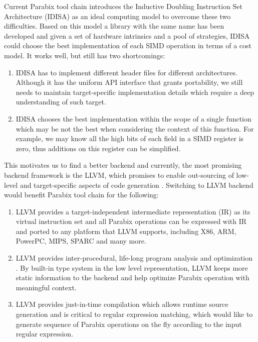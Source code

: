 Current Parabix tool chain introduces the Inductive Doubling Instruction Set Architecture (IDISA) as an ideal computing model to overcome these two difficulties. Based on this model a library with the same name has been developed and given a set of hardware intrinsics and a pool of strategies, IDISA could choose the best implementation of each SIMD operation in terms of a cost model. It works well, but still has two shortcomings:

\begin{enumerate}
  \item IDISA has to implement different header files for different architectures. Although it has the uniform API interface that grants portability, we still needs to maintain target-specific implementation details which require a deep understanding of such target.
  \item IDISA chooses the best implementation within the scope of a single function which may be not the best when considering the context of this function. For example, we may know all the high bits of each field in a SIMD register is zero, thus additions on this register can be simplified.
\end{enumerate}

This motivates us to find a better backend and currently, the most promising backend framework is the LLVM, which promises to enable out-sourcing of low-level and target-specific aspects of code generation \cite{llvm_ghc, chris_msthesis}. Switching to LLVM backend would benefit Parabix tool chain for the following:

\begin{enumerate}
  \item LLVM provides a target-independent intermediate representation (IR) as its virtual instruction set and all Parabix operations can be expressed with IR and ported to any platform that LLVM supports, including X86, ARM, PowerPC, MIPS, SPARC and many more.
  \item LLVM provides inter-procedural, life-long program analysis and optimization \cite{llvm_cgo04}. By built-in type system in the low level representation, LLVM keeps more static information to the backend and help optimize Parabix operation with meaningful context.
  \item LLVM provides just-in-time compilation which allows runtime source generation and is critical to regular expression matching, which would like to generate sequence of Parabix operations on the fly according to the input regular expression.
\end{enumerate}

